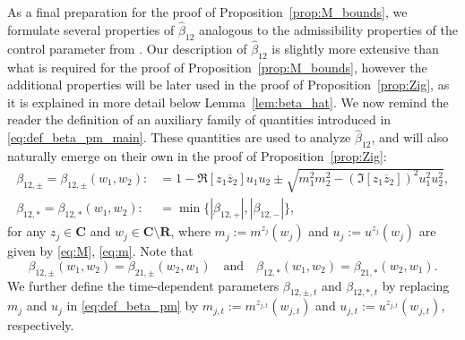 \documentclass[10pt]{amsart}
\numberwithin{equation}{section}
\newcommand{\R}{\mathbf{R}}
\newcommand{\C}{\mathbf{C}}
\begin{document}
As a final preparation for the proof of Proposition~\ref{prop:M_bounds}, we formulate several properties of $\widehat{\beta}_{12}$ analogous to the admissibility properties of the control parameter from \cite[Definition~4.4]{eigenv_decorr}. Our description of $\widehat{\beta}_{12}$ is slightly more extensive than what is required for the proof of Proposition~\ref{prop:M_bounds}, however the additional properties will be later used in the proof of Proposition~\ref{prop:Zig}, as it is explained in more detail below Lemma~\ref{lem:beta_hat}. We now remind the reader the definition of an auxiliary family of quantities introduced in \eqref{eq:def_beta_pm_main}. These quantities are used to analyze $\widehat{\beta}_{12}$, and will also naturally emerge on their own in the proof of Proposition~\ref{prop:Zig}:
\begin{equation}
\begin{split}
\beta_{12,\pm} =\beta_{12,\pm}(w_1,w_2) :&=1-\Re \left[z_1\overline{z}_2\right] u_1u_2\pm \sqrt{m_1^2m_2^2 - \left(\Im \left[z_1\overline{z}_2\right]\right)^2u_1^2u_2^2},\\
\beta_{12,*}=\beta_{12,*}(w_1,w_2):&=\min\{|\beta_{12,+}|,|\beta_{12,-}|\},
\end{split}
\label{eq:def_beta_pm}
\end{equation}
for any $z_j\in \C$ and $w_j\in \C\setminus\R$, where $m_j:=m^{z_j}(w_j)$ and $u_j:=u^{z_j}(w_j)$ are given by \eqref{eq:M}, \eqref{eq:m}. Note that
\begin{equation*}
\beta_{12,\pm}(w_1,w_2)=\beta_{21,\pm}(w_2,w_1)\quad\text{and}\quad \beta_{12,*}(w_1,w_2)=\beta_{21,*}(w_2,w_1).
\end{equation*}
We further define the time-dependent parameters $\beta_{12,\pm,t}$ and $\beta_{12,*,t}$ by replacing $m_j$ and $u_j$ in \eqref{eq:def_beta_pm} by $m_{j,t}:=m^{z_{j,t}}(w_{j,t})$ and $u_{j,t}:=u^{z_{j,t}}(w_{j,t})$, respectively.
\end{document}
